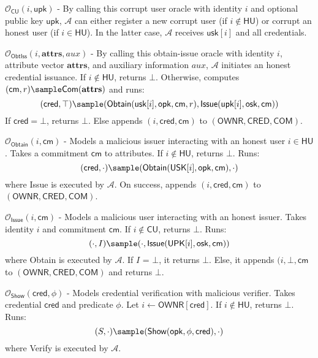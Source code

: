 \noindent $\mathcal{O}_{\mathsf{CU}}(i, \mathsf{upk})$ - By calling this corrupt user oracle with identity $i$ and optional public key $\mathsf{upk}$, $\mathcal{A}$ can either register a new corrupt user (if $i \notin \mathsf{HU}$) or corrupt an honest user (if $i \in \mathsf{HU}$). In the latter case, $\mathcal{A}$ receives $\mathsf{usk}[i]$ and all credentials.

\noindent $\mathcal{O}_{\mathsf{ObtIss}}(i, \mathbf{attrs}, aux)$ - By calling this obtain-issue oracle with identity $i$, attribute vector $\mathbf{attrs}$, and auxiliary information $aux$, $\mathcal{A}$ initiates an honest credential issuance. If $i \notin \mathsf{HU}$, returns $\bot$. Otherwise, computes $(\mathsf{cm}, r) \sample \mathsf{Com}(\mathbf{attrs})$ and runs:
\[
(\mathsf{cred}, \top) \sample (\mathsf{Obtain}(\mathsf{usk}[i], \mathsf{opk}, \mathsf{cm}, r), \mathsf{Issue}(\mathsf{upk}[i], \mathsf{osk}, \mathsf{cm}))
\]
If $\mathsf{cred} = \bot$, returns $\bot$. Else appends $(i, \mathsf{cred}, \mathsf{cm})$ to $(\mathsf{OWNR}, \mathsf{CRED}, \mathsf{COM})$.

\noindent  $\mathcal{O}_{\mathsf{Obtain}}(i, \mathsf{cm})$ - Models a malicious issuer interacting with an honest user $i \in \mathsf{HU}$. Takes a commitment $\mathsf{cm}$ to attributes. If $i \notin \mathsf{HU}$, returns $\bot$. Runs:
\[
(\mathsf{cred}, \cdot) \sample (\mathsf{Obtain}(\mathsf{USK}[i], \mathsf{opk}, \mathsf{cm}), \cdot)
\]
where Issue is executed by $\mathcal{A}$. On success, appends $(i, \mathsf{cred}, \mathsf{cm})$ to $(\mathsf{OWNR}, \mathsf{CRED}, \mathsf{COM})$.

\noindent  $\mathcal{O}_{\mathsf{Issue}}(i, \mathsf{cm})$ - Models a malicious user interacting with an honest issuer. Takes identity $i$ and commitment $\mathsf{cm}$. If $i \notin \mathsf{CU}$, returns $\bot$. Runs:
\[
(\cdot, I) \sample (\cdot, \mathsf{Issue}(\mathsf{UPK}[i], \mathsf{osk}, \mathsf{cm}))
\]
where Obtain is executed by $\mathcal{A}$. If $I$ = $\bot$, it returns $\bot$. Else, it appends $(i, \bot, \mathsf{cm}$ to $(\mathsf{OWNR}, \mathsf{CRED}, \mathsf{COM})$ and returns $\bot$.

\noindent  $\mathcal{O}_{\mathsf{Show}}(\mathsf{cred}, \phi)$ - Models credential verification with malicious verifier. Takes credential $\mathsf{cred}$ and predicate $\phi$. Let $i \gets \mathsf{OWNR}[\mathsf{cred}]$. If $i \notin \mathsf{HU}$, returns $\bot$. Runs:
\[
(S, \cdot) \sample (\mathsf{Show}(\mathsf{opk}, \phi, \mathsf{cred}), \cdot)
\]
where Verify is executed by $\mathcal{A}$.


